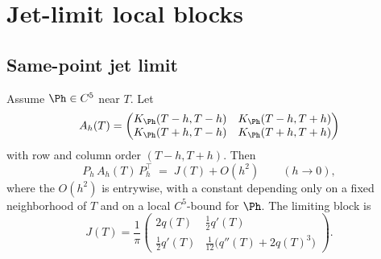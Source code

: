 \section{Jet-limit local blocks}
\label{sec:jet-limit-local-blocks}
\quad
{}\quad
{}\quad
{}\quad
{}\quad
{}
\par\medskip

\subsection{Same-point jet limit}
\label{subsec:same-point-jet-limit}

\begin{lemma}
\label{lem:same-point-jet-limit}
Assume \(\Ph\in C^5\) near \(T\).  Let
\[
A_h(T)=
\begin{pmatrix}
K_\Ph(T-h,T-h) & K_\Ph(T-h,T+h)\\
K_\Ph(T+h,T-h) & K_\Ph(T+h,T+h)
\end{pmatrix}
\]
with row and column order \((T-h, T+h)\).  Then
\[
        P_h\,A_h(T)\,P_h^\top \;=\; J(T) + O(h^2)
        \qquad (h\to 0),
\]
where the \(O(h^2)\) is entrywise, with a constant depending only on a
fixed neighborhood of \(T\) and on a local \(C^5\)-bound for \(\Ph\).  The
limiting block is
\begin{equation}
\label{eq:same-point-J}
J(T)=\frac1\pi
\begin{pmatrix}
2q(T) & \tfrac12 q'(T)\\[1ex]
\tfrac12 q'(T) & \tfrac1{12}\bigl(q''(T)+2q(T)^3\bigr)
\end{pmatrix}.
\end{equation}
\end{lemma}

